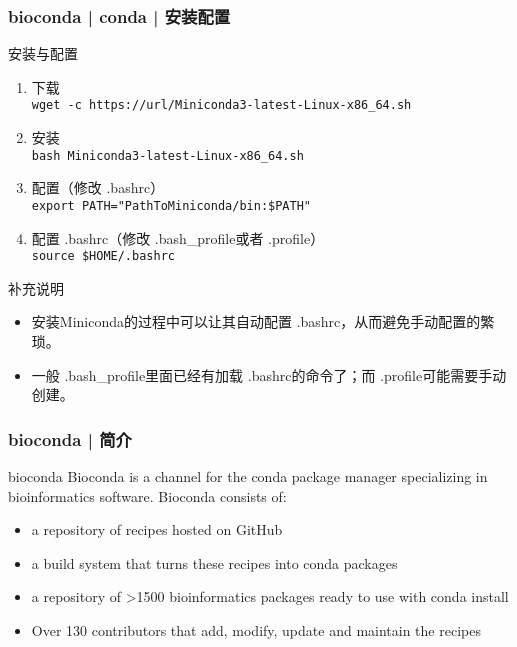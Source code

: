 \begin{frame}[fragile]
  \frametitle{bioconda | conda | 安装配置}
  \begin{block}{安装与配置}
    \begin{enumerate}
      \item 下载\\ \verb|wget -c https://url/Miniconda3-latest-Linux-x86_64.sh|
      \item 安装\\ \verb|bash Miniconda3-latest-Linux-x86_64.sh|
      \item 配置（修改 .bashrc）\\ \verb|export PATH="PathToMiniconda/bin:$PATH"|
      \item 配置 .bashrc（修改 .bash\_profile或者 .profile）\\ \verb|source $HOME/.bashrc|
    \end{enumerate}
  \end{block}
  \pause
  \begin{block}{补充说明}
    \begin{itemize}
      \item {\footnotesize 安装Miniconda的过程中可以让其自动配置 .bashrc，从而避免手动配置的繁琐。}
      \item {\footnotesize 一般 .bash\_profile里面已经有加载 .bashrc的命令了；而 .profile可能需要手动创建。}
    \end{itemize}
  \end{block}
\end{frame}

\begin{frame}
  \frametitle{bioconda | 简介}
  \begin{block}{bioconda}
    Bioconda is a channel for the conda package manager specializing in bioinformatics software. Bioconda consists of:
    \begin{itemize}
      \item a repository of recipes hosted on GitHub
      \item a build system that turns these recipes into conda packages
      \item a repository of >1500 bioinformatics packages ready to use with conda install
      \item Over 130 contributors that add, modify, update and maintain the recipes
    \end{itemize}
  \end{block}
\end{frame}

